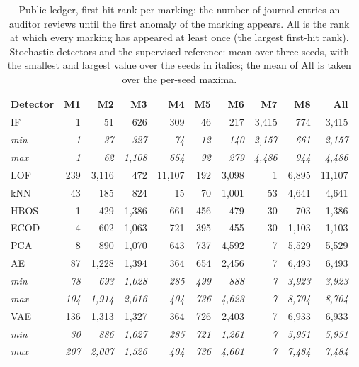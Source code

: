 \begin{table}[tbp]
\caption{Public ledger, first-hit rank per marking: the number of journal entries an auditor reviews until the first anomaly of the marking appears. All is the rank at which every marking has appeared at least once (the largest first-hit rank). Stochastic detectors and the supervised reference: mean over three seeds, with the smallest and largest value over the seeds in italics; the mean of All is taken over the per-seed maxima.}
\label{tab:s-firsthit}
\centering
\footnotesize
\setlength{\tabcolsep}{4pt}
\begin{tabular}{@{}lrrrrrrrrr@{}}
\toprule
Detector & M1 & M2 & M3 & M4 & M5 & M6 & M7 & M8 & All \\
\midrule
IF & 1 & 51 & 626 & 309 & 46 & 217 & 3,415 & 774 & 3,415 \\
\quad\textit{min} & \textit{1} & \textit{37} & \textit{327} & \textit{74} & \textit{12} & \textit{140} & \textit{2,157} & \textit{661} & \textit{2,157} \\
\quad\textit{max} & \textit{1} & \textit{62} & \textit{1,108} & \textit{654} & \textit{92} & \textit{279} & \textit{4,486} & \textit{944} & \textit{4,486} \\
LOF & 239 & 3,116 & 472 & 11,107 & 192 & 3,098 & 1 & 6,895 & 11,107 \\
kNN & 43 & 185 & 824 & 15 & 70 & 1,001 & 53 & 4,641 & 4,641 \\
HBOS & 1 & 429 & 1,386 & 661 & 456 & 479 & 30 & 703 & 1,386 \\
ECOD & 4 & 602 & 1,063 & 721 & 395 & 455 & 30 & 1,103 & 1,103 \\
PCA & 8 & 890 & 1,070 & 643 & 737 & 4,592 & 7 & 5,529 & 5,529 \\
AE & 87 & 1,228 & 1,394 & 364 & 654 & 2,456 & 7 & 6,493 & 6,493 \\
\quad\textit{min} & \textit{78} & \textit{693} & \textit{1,028} & \textit{285} & \textit{499} & \textit{888} & \textit{7} & \textit{3,923} & \textit{3,923} \\
\quad\textit{max} & \textit{104} & \textit{1,914} & \textit{2,016} & \textit{404} & \textit{736} & \textit{4,623} & \textit{7} & \textit{8,704} & \textit{8,704} \\
VAE & 136 & 1,313 & 1,327 & 364 & 726 & 2,403 & 7 & 6,933 & 6,933 \\
\quad\textit{min} & \textit{30} & \textit{886} & \textit{1,027} & \textit{285} & \textit{721} & \textit{1,261} & \textit{7} & \textit{5,951} & \textit{5,951} \\
\quad\textit{max} & \textit{207} & \textit{2,007} & \textit{1,526} & \textit{404} & \textit{736} & \textit{4,601} & \textit{7} & \textit{7,484} & \textit{7,484} \\

\end{tabular}
\end{table}
